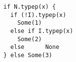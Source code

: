 \begin{lstlisting}[style=scalaioScala]
if N.typep(x) {
  if (!I).typep(x)
    Some(1)
  else if I.typep(x)
    Some(2)
  else      None
} else Some(3)
\end{lstlisting}
